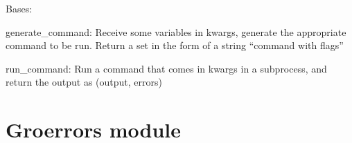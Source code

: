 \documentclass[letterpaper,10pt,english]{sphinxmanual}
\begin{document}

\begin{fulllineitems}
\label{\detokenize{gromacs:gromacs.Wrapper}}
\pysigstartsignatures
{}
\pysigstopsignatures
\sphinxAtStartPar
Bases: 

\begin{fulllineitems}
\label{\detokenize{gromacs:gromacs.Wrapper.generate_command}}
\pysigstartsignatures
{}
\pysigstopsignatures
\sphinxAtStartPar
generate\_command: Receive some variables in kwargs, generate
the appropriate command to be run. Return a set in the form of
a string “command \sphinxhyphen{}with flags”

\end{fulllineitems}


\begin{fulllineitems}
\label{\detokenize{gromacs:gromacs.Wrapper.run_command}}
\pysigstartsignatures
{}
\pysigstopsignatures
\sphinxAtStartPar
run\_command: Run a command that comes in kwargs in a subprocess, and
return the output as (output, errors)

\end{fulllineitems}


\end{fulllineitems}


\sphinxstepscope


\section{Groerrors module}
\label{\detokenize{groerrors:module-groerrors}}\label{\detokenize{groerrors:groerrors-module}}\label{\detokenize{groerrors::doc}}
\end{document}
